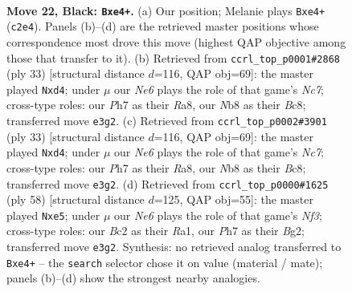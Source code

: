 \documentclass[11pt]{article}
\begin{document}
\clearpage

\begin{figure}[p]\centering
\begin{subfigure}{0.46\textwidth}\centering
\resizebox{\linewidth}{!}{%
\newchessgame
\chessboard[
  setfen={rn4k1/pQ3ppp/4p3/8/2r1P2P/4nN2/PPbN2R1/R1K5 b - - 2 22},
  showmover=false,
  pgfstyle=straightmove, color=movearrow, markmove={c2-e4}
]}
\caption{}
\end{subfigure}\hfill
\begin{subfigure}{0.46\textwidth}\centering
\resizebox{\linewidth}{!}{%
\newchessgame
\chessboard[
  setfen={r1b1k2r/p4p2/2p1p3/1P6/2pQ4/2N5/1Pn2PPP/R2K1B1R b kq - 2 17},
  showmover=false,
  pgfstyle=straightmove, color=movearrow, markmove={c2-d4}
]}
\caption{}
\end{subfigure}
\\[4pt]
\begin{subfigure}{0.46\textwidth}\centering
\resizebox{\linewidth}{!}{%
\newchessgame
\chessboard[
  setfen={r1b1k2r/p4p2/2p1p3/1P6/2pQ4/2N5/1Pn2PPP/R2K1B1R b kq - 2 17},
  showmover=false,
  pgfstyle=straightmove, color=movearrow, markmove={c2-d4}
]}
\caption{}
\end{subfigure}\hfill
\begin{subfigure}{0.46\textwidth}\centering
\resizebox{\linewidth}{!}{%
\newchessgame
\chessboard[
  setfen={r3N2k/1p4pp/2p2n2/p3q3/Pn6/1b3NPP/1P2P1B1/R2R2K1 w - - 0 30},
  showmover=false,
  pgfstyle=straightmove, color=movearrow, markmove={f3-e5}
]}
\caption{}
\end{subfigure}
\caption{\textbf{Move 22, Black: \texttt{Bxe4+}.} (a) Our position; Melanie plays \texttt{Bxe4+} (\texttt{c2e4}). Panels (b)--(d) are the retrieved master positions whose correspondence most drove this move (highest QAP objective among those that transfer to it). (b) Retrieved from \texttt{ccrl\_top\_p0001\#2868} (ply 33) [structural distance $d$=116, QAP obj=69]: the master played \texttt{Nxd4}; under $\mu$ our \emph{Ne6} plays the role of that game's \emph{Nc7}; cross-type roles: our \emph{P}h7 as their \emph{R}a8, our \emph{N}b8 as their \emph{B}c8; transferred move \texttt{e3g2}. (c) Retrieved from \texttt{ccrl\_top\_p0002\#3901} (ply 33) [structural distance $d$=116, QAP obj=69]: the master played \texttt{Nxd4}; under $\mu$ our \emph{Ne6} plays the role of that game's \emph{Nc7}; cross-type roles: our \emph{P}h7 as their \emph{R}a8, our \emph{N}b8 as their \emph{B}c8; transferred move \texttt{e3g2}. (d) Retrieved from \texttt{ccrl\_top\_p0000\#1625} (ply 58) [structural distance $d$=125, QAP obj=55]: the master played \texttt{Nxe5}; under $\mu$ our \emph{Ne6} plays the role of that game's \emph{Nf3}; cross-type roles: our \emph{B}c2 as their \emph{R}a1, our \emph{P}h7 as their \emph{B}g2; transferred move \texttt{e3g2}. Synthesis: no retrieved analog transferred to \texttt{Bxe4+} -- the \texttt{search} selector chose it on value (material / mate); panels (b)--(d) show the strongest nearby analogies.}
\label{fig:thought-m43}
\end{figure}
\end{document}
